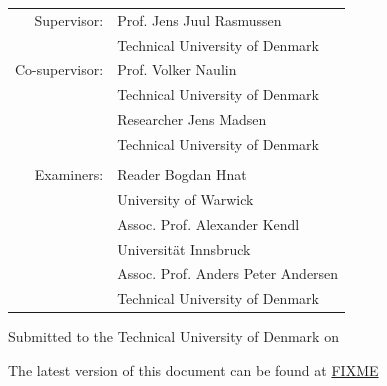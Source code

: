 \begin{titlepage}
\begin{center}
        \large
        {\def\arraystretch{1}\tabcolsep=10pt
        \begin{tabular}{rl}
        Supervisor:    & Prof. Jens Juul Rasmussen          \\ & Technical University of Denmark\\
        Co-supervisor: & Prof. Volker Naulin                \\ & Technical University of Denmark\\
                       & Researcher Jens Madsen             \\ & Technical University of Denmark\\
        &\\
        Examiners:     & Reader Bogdan Hnat                 \\ & University of Warwick\\
                       & Assoc. Prof. Alexander Kendl       \\ & Universit{\"a}t Innsbruck\\
                       & Assoc. Prof. Anders Peter Andersen \\ & Technical University of Denmark\\
        \end{tabular}
        }

        \vfill

        Submitted to the Technical University of Denmark on \thesisDate

        \vfill
        The latest version of this document can be found at \href{FIXME}{FIXME}
    \end{center}
\end{titlepage}

